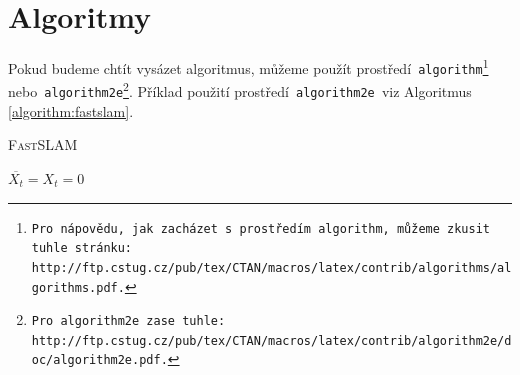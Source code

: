 \documentclass[a4paper, 11pt]{article}
\begin{document}
	\bigskip
	\pagebreak


	\section{Algoritmy}
	\label{section:algoritmy}

	Pokud budeme chtít vysázet algoritmus, můžeme použít prostředí\texttt{ algorithm\footnote{
		Pro nápovědu, jak zacházet s prostředím\texttt{ algorithm,} můžeme zkusit tuhle stránku: \\
		http://ftp.cstug.cz/pub/tex/CTAN/macros/latex/contrib/algorithms/algorithms.pdf.
	} }
	nebo\texttt{ algorithm2e\footnote{
		Pro\texttt{ algorithm2e }zase tuhle:
		http://ftp.cstug.cz/pub/tex/CTAN/macros/latex/contrib/algorithm2e/doc/algorithm2e.pdf.
	}}. Příklad použití prostředí\texttt{ algorithm2e }viz Algoritmus \ref{algorithm:fastslam}. \\
	\begin{algorithm}
		\caption{\textsc{Fast}SLAM}
		\label{algorithm:fastslam}


		\BlankLine

		$ \overline{X_t} = X_t = 0 $ \\



	\end{algorithm}
\end{document}
